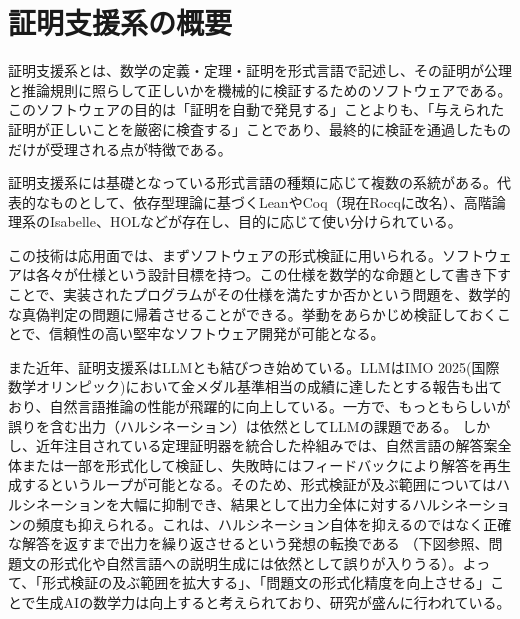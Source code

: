 \documentclass[a4paper,12pt]{bxjsbook}
\newlength{\customindent}
\newenvironment{body}{
  \par
  \begingroup
  \setlength{\leftskip}{\customindent}
  \setlength{\rightskip}{0pt}
  \setlength{\parindent}{1em}
  \setlength{\displayindent}{\customindent}
  \setlength{\displaywidth}{\dimexpr\linewidth-\customindent\relax}
}{
  \par
  \endgroup
}
\theoremstyle{theorem}
\begin{document}
    \section{証明支援系の概要}
    \begin{body}
        \indent 証明支援系とは、数学の定義・定理・証明を形式言語で記述し、その証明が公理と推論規則に照らして正しいかを機械的に検証するためのソフトウェアである。このソフトウェアの目的は「証明を自動で発見する」ことよりも、「与えられた証明が正しいことを厳密に検査する」ことであり、最終的に検証を通過したものだけが受理される点が特徴である。

        \indent 証明支援系には基礎となっている形式言語の種類に応じて複数の系統がある。代表的なものとして、依存型理論に基づくLeanやCoq（現在Rocqに改名）、高階論理系のIsabelle、HOLなどが存在し、目的に応じて使い分けられている。

        \indent この技術は応用面では、まずソフトウェアの形式検証に用いられる。ソフトウェアは各々が仕様という設計目標を持つ。この仕様を数学的な命題として書き下すことで、実装されたプログラムがその仕様を満たすか否かという問題を、数学的な真偽判定の問題に帰着させることができる。挙動をあらかじめ検証しておくことで、信頼性の高い堅牢なソフトウェア開発が可能となる。

        \indent また近年、証明支援系はLLMとも結びつき始めている。LLMはIMO 2025(国際数学オリンピック)において金メダル基準相当の成績に達したとする報告も出ており\cite{DeepMindIMO2025}、自然言語推論の性能が飛躍的に向上している。一方で、もっともらしいが誤りを含む出力（ハルシネーション）は依然としてLLMの課題である。
        しかし、近年注目されている定理証明器を統合した枠組みでは、自然言語の解答案全体または一部を形式化して検証し、失敗時にはフィードバックにより解答を再生成するというループが可能となる。そのため、形式検証が及ぶ範囲についてはハルシネーションを大幅に抑制でき、結果として出力全体に対するハルシネーションの頻度も抑えられる。これは、ハルシネーション自体を抑えるのではなく正確な解答を返すまで出力を繰り返させるという発想の転換である
        （下図参照、問題文の形式化や自然言語への説明生成には依然として誤りが入りうる）。よって、「形式検証の及ぶ範囲を拡大する」、「問題文の形式化精度を向上させる」ことで生成AIの数学力は向上すると考えられており、研究が盛んに行われている。

    \end{body}
\end{document}
